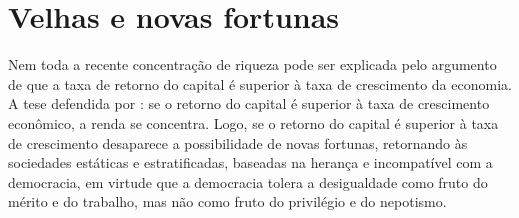 \section{Velhas e novas fortunas}

Nem toda a recente concentração de riqueza pode ser explicada pelo argumento de que a taxa de retorno do capital é superior à taxa de crescimento da economia.
A tese defendida por : se o retorno do capital é superior à taxa de crescimento econômico, a renda se concentra.
Logo, se o retorno do capital é superior à taxa de crescimento desaparece a possibilidade de novas fortunas, retornando às sociedades estáticas e estratificadas, baseadas na herança e incompatível com a democracia, em virtude que a democracia tolera a desigualdade como fruto do mérito e do trabalho, mas não como fruto do privilégio e do nepotismo.
